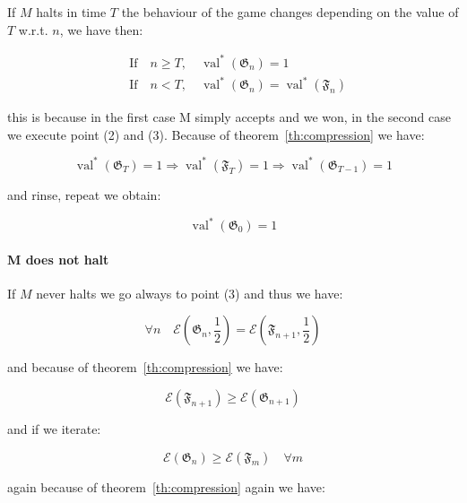 If $M$ halts in time $T$ the behaviour of the game changes depending on the value of $T$ w.r.t. $n$, we have then:

\begin{align}
&\text{If} \quad n \geq T, \quad \operatorname{val}^{*}(\mathfrak{G}_{n}) = 1 \\
&\text{If} \quad n < T, \quad \operatorname{val}^{*}(\mathfrak{G}_{n}) = \operatorname{val}^{*}(\mathfrak{F}_{n})
\end{align}

this is because in the first case M simply accepts and we won, in the second case we execute point (2) and (3). Because of theorem~\ref{th:compression} we have:

\begin{equation}
    \operatorname{val}^{*}(\mathfrak{G}_T) = 1 \Rightarrow \operatorname{val}^{*}(\mathfrak{F}_T) = 1 \Rightarrow \operatorname{val}^{*}(\mathfrak{G}_{T-1}) = 1
\end{equation}


and rinse, repeat we obtain:

\begin{equation}
    \operatorname{val}^{*}(\mathfrak{G}_0) = 1
\end{equation}

\paragraph{M does not halt}
If $M$ never halts we go always to point (3) and thus we have:

\begin{equation}
    \forall n \quad \mathscr{E}\left(\mathfrak{G}_{n}, \frac{1}{2}\right)  = \mathscr{E}\left(\mathfrak{F}_{n+1}, \frac{1}{2}\right)
\end{equation}


and because of theorem~\ref{th:compression} we have:

\begin{equation}
    \mathscr{E}\left(\mathfrak{F}_{n+1}\right) \geq \mathscr{E}\left(\mathfrak{G}_{n+1}\right)
\end{equation}

and if we iterate:

\begin{equation}
    \mathscr{E}\left(\mathfrak{G}_{n}\right) \geq \mathscr{E}\left(\mathfrak{F}_{m}\right) \quad \forall m
\end{equation}

again because of theorem~\ref{th:compression} again we have:

